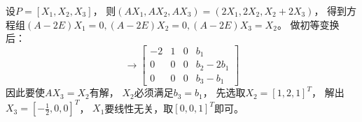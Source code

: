 \begin{solution}
  设$P = [X_1,X_2,X_3]$，
  则$(AX_1,AX_2,AX_3) = (2X_1,2X_2,X_2 + 2X_3)$，
  得到方程组$(A - 2E)X_1 = 0, (A - 2E)X_2 = 0, (A - 2E)X_3 = X_2$。
  做初等变换后：
  \begin{equation*}
    [A|b] \rightarrow
    \left[
      \begin{array}{cccc}
        -2&1&0&b_1 \\
          0&0&0&b_2 - 2b_1 \\
          0&0&0&b_3 - b_1
      \end{array}
    \right]
  \end{equation*}
  因此要使$AX_3 = X_2$有解，
  $X_2$必须满足$b_3 = b_1$，
  先选取$X_2 = [1,2,1]^T$，
  解出$X_3 = [-\frac{1}{2},0,0]^T$，
  $X_1$要线性无关，取$[0,0,1]^T$即可。
\end{solution}





